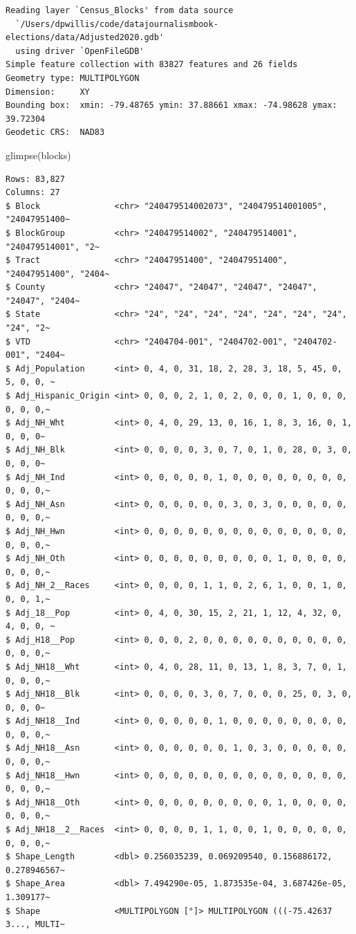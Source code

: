 \documentclass[
  letterpaper,
  DIV=11,
  numbers=noendperiod]{scrreprt}
\newenvironment{Shaded}{\begin{snugshade}}{\end{snugshade}}
\newcommand{\FunctionTok}[1]{\textcolor[rgb]{0.28,0.35,0.67}{#1}}
\newcommand{\NormalTok}[1]{\textcolor[rgb]{0.00,0.23,0.31}{#1}}
\begin{document}
\begin{verbatim}
Reading layer `Census_Blocks' from data source 
  `/Users/dpwillis/code/datajournalismbook-elections/data/Adjusted2020.gdb' 
  using driver `OpenFileGDB'
Simple feature collection with 83827 features and 26 fields
Geometry type: MULTIPOLYGON
Dimension:     XY
Bounding box:  xmin: -79.48765 ymin: 37.88661 xmax: -74.98628 ymax: 39.72304
Geodetic CRS:  NAD83
\end{verbatim}

\begin{Shaded}
\begin{Highlighting}[]
\FunctionTok{glimpse}\NormalTok{(blocks)}
\end{Highlighting}
\end{Shaded}

\begin{verbatim}
Rows: 83,827
Columns: 27
$ Block               <chr> "240479514002073", "240479514001005", "24047951400~
$ BlockGroup          <chr> "240479514002", "240479514001", "240479514001", "2~
$ Tract               <chr> "24047951400", "24047951400", "24047951400", "2404~
$ County              <chr> "24047", "24047", "24047", "24047", "24047", "2404~
$ State               <chr> "24", "24", "24", "24", "24", "24", "24", "24", "2~
$ VTD                 <chr> "2404704-001", "2404702-001", "2404702-001", "2404~
$ Adj_Population      <int> 0, 4, 0, 31, 18, 2, 28, 3, 18, 5, 45, 0, 5, 0, 0, ~
$ Adj_Hispanic_Origin <int> 0, 0, 0, 2, 1, 0, 2, 0, 0, 0, 1, 0, 0, 0, 0, 0, 0,~
$ Adj_NH_Wht          <int> 0, 4, 0, 29, 13, 0, 16, 1, 8, 3, 16, 0, 1, 0, 0, 0~
$ Adj_NH_Blk          <int> 0, 0, 0, 0, 3, 0, 7, 0, 1, 0, 28, 0, 3, 0, 0, 0, 0~
$ Adj_NH_Ind          <int> 0, 0, 0, 0, 0, 1, 0, 0, 0, 0, 0, 0, 0, 0, 0, 0, 0,~
$ Adj_NH_Asn          <int> 0, 0, 0, 0, 0, 0, 3, 0, 3, 0, 0, 0, 0, 0, 0, 0, 0,~
$ Adj_NH_Hwn          <int> 0, 0, 0, 0, 0, 0, 0, 0, 0, 0, 0, 0, 0, 0, 0, 0, 0,~
$ Adj_NH_Oth          <int> 0, 0, 0, 0, 0, 0, 0, 0, 0, 1, 0, 0, 0, 0, 0, 0, 0,~
$ Adj_NH_2__Races     <int> 0, 0, 0, 0, 1, 1, 0, 2, 6, 1, 0, 0, 1, 0, 0, 0, 1,~
$ Adj_18__Pop         <int> 0, 4, 0, 30, 15, 2, 21, 1, 12, 4, 32, 0, 4, 0, 0, ~
$ Adj_H18__Pop        <int> 0, 0, 0, 2, 0, 0, 0, 0, 0, 0, 0, 0, 0, 0, 0, 0, 0,~
$ Adj_NH18__Wht       <int> 0, 4, 0, 28, 11, 0, 13, 1, 8, 3, 7, 0, 1, 0, 0, 0,~
$ Adj_NH18__Blk       <int> 0, 0, 0, 0, 3, 0, 7, 0, 0, 0, 25, 0, 3, 0, 0, 0, 0~
$ Adj_NH18__Ind       <int> 0, 0, 0, 0, 0, 1, 0, 0, 0, 0, 0, 0, 0, 0, 0, 0, 0,~
$ Adj_NH18__Asn       <int> 0, 0, 0, 0, 0, 0, 1, 0, 3, 0, 0, 0, 0, 0, 0, 0, 0,~
$ Adj_NH18__Hwn       <int> 0, 0, 0, 0, 0, 0, 0, 0, 0, 0, 0, 0, 0, 0, 0, 0, 0,~
$ Adj_NH18__Oth       <int> 0, 0, 0, 0, 0, 0, 0, 0, 0, 1, 0, 0, 0, 0, 0, 0, 0,~
$ Adj_NH18__2__Races  <int> 0, 0, 0, 0, 1, 1, 0, 0, 1, 0, 0, 0, 0, 0, 0, 0, 0,~
$ Shape_Length        <dbl> 0.256035239, 0.069209540, 0.156886172, 0.278946567~
$ Shape_Area          <dbl> 7.494290e-05, 1.873535e-04, 3.687426e-05, 1.309177~
$ Shape               <MULTIPOLYGON [°]> MULTIPOLYGON (((-75.42637 3..., MULTI~
\end{verbatim}
\end{document}
